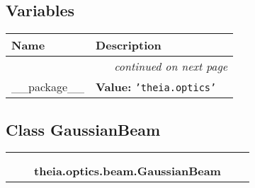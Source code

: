 
  \subsection{Variables}

    \vspace{-1cm}
\hspace{\varindent}\begin{longtable}{|p{\varnamewidth}|p{\vardescrwidth}|l}
\cline{1-2}
\cline{1-2} \centering \textbf{Name} & \centering \textbf{Description}& \\
\cline{1-2}
\endhead\cline{1-2}\multicolumn{3}{r}{\small\textit{continued on next page}}\\\endfoot\cline{1-2}
\endlastfoot\raggedright \_\-\_\-p\-a\-c\-k\-a\-g\-e\-\_\-\_\- & \raggedright \textbf{Value:} 
{\tt \texttt{'}\texttt{theia.optics}\texttt{'}}&\\
\cline{1-2}
\end{longtable}



\subsection{Class GaussianBeam}

    \label{theia:optics:beam:GaussianBeam}
\begin{tabular}{cccccc}
\multicolumn{2}{r}{\settowidth{\BCL}{object}\multirow{2}{\BCL}{object}}
&&
  \\\cline{3-3}
  &&\multicolumn{1}{c|}{}
&&
  \\
&&\multicolumn{2}{l}{\textbf{theia.optics.beam.GaussianBeam}}
\end{tabular}

